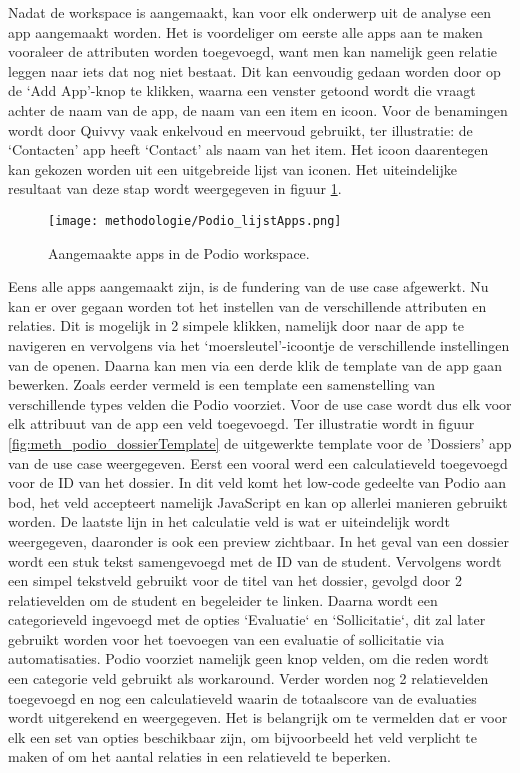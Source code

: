 Nadat de workspace is aangemaakt, kan voor elk onderwerp uit de analyse een app aangemaakt worden. Het is voordeliger om eerste alle apps aan te maken vooraleer de attributen worden toegevoegd, want men kan namelijk geen relatie leggen naar iets dat nog niet bestaat. Dit kan eenvoudig gedaan worden door op de ‘Add App’-knop te klikken, waarna een venster getoond wordt die vraagt achter de naam van de app, de naam van een item en icoon. Voor de benamingen wordt door Quivvy vaak enkelvoud en meervoud gebruikt, ter illustratie: de ‘Contacten’ app heeft ‘Contact’ als naam van het item. Het icoon daarentegen kan gekozen worden uit een uitgebreide lijst van iconen. Het uiteindelijke resultaat van deze stap wordt weergegeven in figuur \ref{fig:meth_podio_lijstApps}. \\

\begin{figure}[ht]
    \centering
    \texttt{[image: methodologie/Podio\_lijstApps.png]}
    \caption{Aangemaakte apps in de Podio workspace.}
    \label{fig:meth_podio_lijstApps}
\end{figure}

Eens alle apps aangemaakt zijn, is de fundering van de use case afgewerkt. Nu kan er over gegaan worden tot het instellen van de verschillende attributen en relaties. Dit is mogelijk in 2 simpele klikken, namelijk door naar de app te navigeren en vervolgens via het ‘moersleutel’-icoontje de verschillende instellingen van de openen. Daarna kan men via een derde klik de template van de app gaan bewerken. Zoals eerder vermeld is een template een samenstelling van verschillende types velden die Podio voorziet. Voor de use case wordt dus elk voor elk attribuut van de app een veld toegevoegd. Ter illustratie wordt in figuur \ref{fig:meth_podio_dossierTemplate} de uitgewerkte template voor de 'Dossiers' app van de use case weergegeven. Eerst een vooral werd een calculatieveld toegevoegd voor de ID van het dossier. In dit veld komt het low-code gedeelte van Podio aan bod, het veld accepteert namelijk JavaScript en kan op allerlei manieren gebruikt worden. De laatste lijn in het calculatie veld is wat er uiteindelijk wordt weergegeven, daaronder is ook een preview zichtbaar. In het geval van een dossier wordt een stuk tekst samengevoegd met de ID van de student. Vervolgens wordt een simpel tekstveld gebruikt voor de titel van het dossier, gevolgd door 2 relatievelden om de student en begeleider te linken. Daarna wordt een categorieveld ingevoegd met de opties `Evaluatie` en `Sollicitatie`, dit zal later gebruikt worden voor het toevoegen van een evaluatie of sollicitatie via automatisaties. Podio voorziet namelijk geen knop velden, om die reden wordt een categorie veld gebruikt als workaround. Verder worden nog 2 relatievelden toegevoegd en nog een calculatieveld waarin de totaalscore van de evaluaties wordt uitgerekend en weergegeven. Het is belangrijk om te vermelden dat er voor elk een set van opties beschikbaar zijn, om bijvoorbeeld het veld verplicht te maken of om het aantal relaties in een relatieveld te beperken. \\

